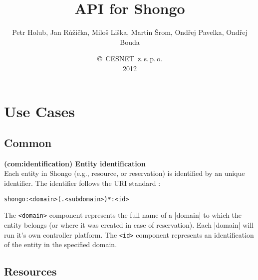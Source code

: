 \documentclass[a4paper]{report}
\makeatletter
\newcommand{\ApiValue}[1]{\verb|#1|}
\newcounter{UCcounter}
\newenvironment{UseCases}%
	{\begin{list}{\textbf{UC-\arabic{UCcounter}}}{\@nmbrlisttrue\def\@listctr{UCcounter}}}%
	{\end{list}}
\newcommand{\UClabel}[1]{\label{UC:#1}}
\newcommand{\UseCase}[2]{\item\UClabel{#2} \textbf{(#2) #1}\\ \nopagebreak}
\makeatother
\begin{document}
\title{API for Shongo}
\author{Petr Holub, Jan Růžička, Miloš Liška, Martin Šrom, Ondřej Pavelka, Ondřej Bouda}
\date{\copyright~CESNET~z.\,s.\,p.\,o.\\2012}

\maketitle

\tableofcontents

\chapter{Use Cases}

\section{Common}

\begin{UseCases}

\UseCase{Entity identification}{com:identification}
Each entity in Shongo (e.g., resource, or reservation) is identified by an unique identifier.
The identifier follows the URI standard \cite{rfc3986}:
\begin{verbatim}
shongo:<domain>(.<subdomain>)*:<id>
\end{verbatim}
The \ApiValue{<domain>} component represents the full name of a |domain| to which the entity belongs (or where it was created in case of reservation). Each |domain| will run it's own controller platform. The \ApiValue{<id>} component represents an identification of the entity in the specified domain.

\end{UseCases}


\section{Resources}
\end{document}
